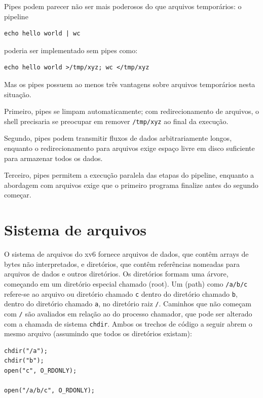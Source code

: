 Pipes podem parecer não ser mais poderosos do que arquivos temporários:
o pipeline
\begin{lstlisting}[]
echo hello world | wc
\end{lstlisting}
poderia ser implementado sem pipes como:
\begin{lstlisting}[]
echo hello world >/tmp/xyz; wc </tmp/xyz
\end{lstlisting}
Mas os pipes possuem ao menos três vantagens sobre arquivos temporários
nesta situação.

Primeiro, pipes se limpam automaticamente;
com redirecionamento de arquivos, o shell precisaria
se preocupar em remover
\lstinline{/tmp/xyz}
ao final da execução.

Segundo, pipes podem transmitir fluxos de dados arbitrariamente longos,
enquanto o redirecionamento para arquivos exige espaço livre em disco
suficiente para armazenar todos os dados.

Terceiro, pipes permitem a execução paralela das etapas do pipeline,
enquanto a abordagem com arquivos exige que o primeiro programa finalize
antes do segundo começar.


\section{Sistema de arquivos}

O sistema de arquivos do xv6 fornece arquivos de dados,
que contêm arrays de bytes não interpretados,
e diretórios, que
contêm referências nomeadas para arquivos de dados e outros diretórios.
Os diretórios formam uma árvore, começando
em um diretório especial chamado
 (root).
Um
 (path)
como
\lstinline{/a/b/c}
refere-se ao arquivo ou diretório chamado
\lstinline{c}
dentro do diretório chamado
\lstinline{b},
dentro do diretório chamado
\lstinline{a},
no diretório raiz
\lstinline{/}.
Caminhos que não começam com
\lstinline{/}
são avaliados em relação ao
do processo chamador,
que pode ser alterado com a chamada de sistema
\lstinline{chdir}.
Ambos os trechos de código a seguir abrem o mesmo arquivo
(assumindo que todos os diretórios existam):

\begin{lstlisting}[]
chdir("/a");
chdir("b");
open("c", O_RDONLY);

open("/a/b/c", O_RDONLY);
\end{lstlisting}

